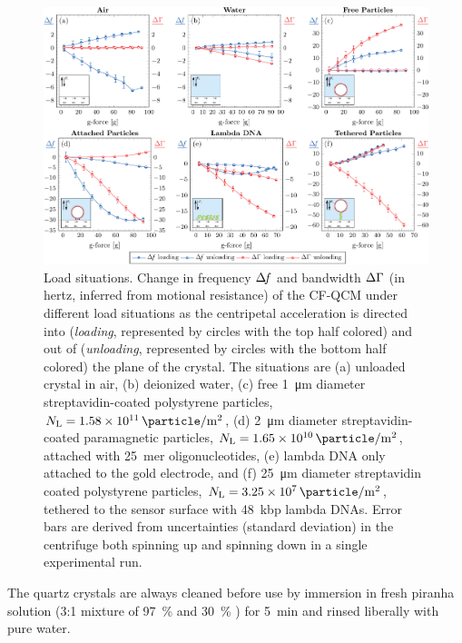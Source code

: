 \begin{figure}[ht]
\centering
\includegraphics[width=16cm,keepaspectratio]{qcm/figures/figure2.pdf}
\caption{Load situations.
Change in frequency $\Delta\!f$ and bandwidth $\Delta\Gamma$
(in hertz, inferred from motional resistance) of
the CF-QCM under different load situations as the centripetal acceleration
is directed into (\textit{loading}, represented by circles with the top half
colored) and out of (\textit{unloading}, represented by circles with the
bottom half colored) the plane of the crystal.
The situations are
(a) unloaded crystal in air,
(b) deionized water,
(c) free \SI{1}{\micro\meter} diameter streptavidin-coated polystyrene
particles, $N_\mathrm{L}=\SI{1.58e11}{\particle\per\meter\squared}$,
(d) \SI{2}{\micro\meter} diameter streptavidin-coated paramagnetic
particles, $N_\mathrm{L}=\SI{1.65e10}{\particle\per\meter\squared}$,
attached with \SI{25}{mer} oligonucleotides,
(e) lambda DNA only attached to the gold electrode, and
(f) \SI{25}{\micro\meter} diameter streptavidin
coated polystyrene particles,
$N_\mathrm{L}=\SI{3.25e7}{\particle\per\meter\squared}$, tethered to the sensor surface with
\SI{48}{kbp} lambda DNAs.  Error bars are derived from uncertainties
(standard deviation) in the centrifuge both spinning up and spinning down in a single experimental run.}
\label{fig:loadplot}
\end{figure}
The quartz crystals are always cleaned before use by immersion
in fresh piranha solution (3:1 mixture of \SI{97}{\percent}  and
\SI{30}{\percent} ) for \SI{5}{\minute} and rinsed liberally with
pure water.

